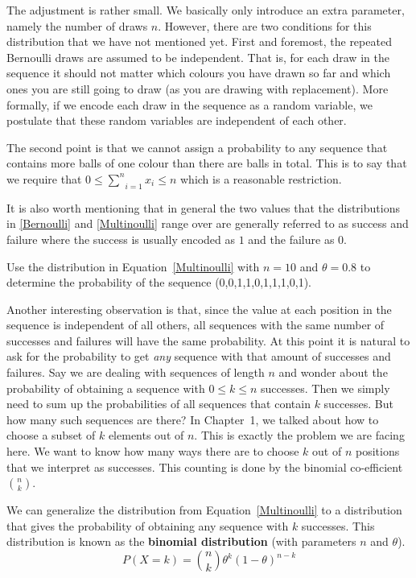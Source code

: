 The adjustment is rather small. We basically only introduce an extra parameter, namely the number of draws $ n $. 
However, there are two conditions for this distribution that we have not mentioned yet. First and foremost,
the repeated Bernoulli draws are assumed to be independent. That is, for each draw in the sequence it should not matter which colours you
have drawn so far and which ones you are still going to draw (as you
are drawing with replacement). More formally, if we encode each draw in the sequence as a random
variable, we postulate that these random variables are independent of each other. 

The second point is that we cannot assign a probability to any sequence that contains more balls of one colour than there are balls in total.
This is to say that we require that $ 0 \leq \underset{i=1}{\overset{n}{\sum}}x_{i} \leq n $ which is a reasonable restriction. 

It is also worth mentioning that in general the two values that the distributions in \eqref{Bernoulli} and \eqref{Multinoulli} range
over are generally referred to as success and failure where the success is usually encoded as $ 1 $ and the failure as $ 0 $. 

\begin{Exercise}
Use the distribution in Equation~\eqref{Multinoulli} with $ n = 10 $ and $ \theta = 0.8 $ to determine the probability of the sequence (0,0,1,1,0,1,1,1,0,1).
\end{Exercise}

Another interesting observation is that, since the value at each position in the sequence is independent of all others, all sequences with the same
number of successes and failures will have the same probability. At this point it is natural to ask for the probability to get \textit{any}
sequence with that amount of successes and failures. Say we are dealing with sequences of length $ n $ and wonder about the probability of 
obtaining a sequence with $ 0 \leq k \leq n $ successes. Then we simply need to sum up the probabilities of all sequences that contain $ k $ 
successes. But how many such sequences are there? In Chapter~1, we talked about how to choose a subset of $ k $ elements
out of $ n $. This is exactly the problem we are facing here. We want to know how many ways there are to choose $ k $ out of $ n $ positions
that we interpret as successes. This counting is done by the binomial co-efficient $ \binom{n}{k} $.

We can generalize the distribution from Equation~\eqref{Multinoulli} to a distribution that gives the probability of obtaining any sequence
with $ k $ successes. This distribution is known as the \textbf{binomial distribution} (with parameters $ n $ and $ \theta $).
\begin{equation}
P(X=k) = \binom{n}{k} \theta^{k} (1-\theta)^{n-k}
\end{equation}

